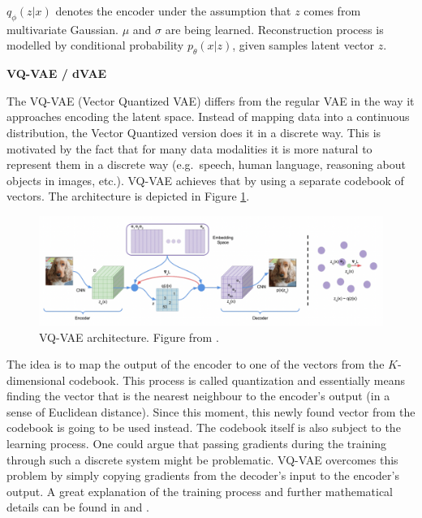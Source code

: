 \documentclass[
]{krantz}
\begin{document}
\(q_{\phi}(z|x)\) denotes the encoder under the assumption that \(z\) comes from multivariate Gaussian. \(\mu\) and \(\sigma\) are being learned. Reconstruction process is modelled by conditional probability \(p_{\theta}(x|z)\), given samples latent vector \(z\).

\textbf{VQ-VAE / dVAE}

The VQ-VAE (Vector Quantized VAE) \citep{VQVAE2017} differs from the regular VAE in the way it approaches encoding the latent space. Instead of mapping data into a continuous distribution, the Vector Quantized version does it in a discrete way. This is motivated by the fact that for many data modalities it is more natural to represent them in a discrete way (e.g.~speech, human language, reasoning about objects in images, etc.). VQ-VAE achieves that by using a separate codebook of vectors. The architecture is depicted in Figure \ref{fig:vqvae}.

\begin{figure}

{\centering \includegraphics[width=1\linewidth]{figures/02-02-text-2-img/vqvae} 

}

\caption{VQ-VAE architecture. Figure from \citet{VQVAE2017}.}\label{fig:vqvae}
\end{figure}



The idea is to map the output of the encoder to one of the vectors from the \(K\)-dimensional codebook. This process is called quantization and essentially means finding the vector that is the nearest neighbour to the encoder's output (in a sense of Euclidean distance). Since this moment, this newly found vector from the codebook is going to be used instead. The codebook itself is also subject to the learning process. One could argue that passing gradients during the training through such a discrete system might be problematic. VQ-VAE overcomes this problem by simply copying gradients from the decoder's input to the encoder's output. A great explanation of the training process and further mathematical details can be found in \citet{weng2018VAE} and \citet{UnderstandingVQVAE}.
\end{document}
